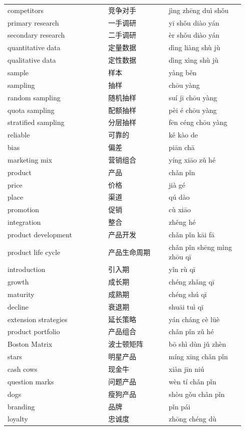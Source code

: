 \documentclass[11pt]{article}
\begin{document}
\begin{longtable}{@{}p{0.40\linewidth}p{0.24\linewidth}p{0.30\linewidth}@{}}
competitors & 竞争对手 & jìng zhēng duì shǒu \\
primary research & 一手调研 & yī shǒu diào yán \\
secondary research & 二手调研 & èr shǒu diào yán \\
quantitative data & 定量数据 & dìng liàng shù jù \\
qualitative data & 定性数据 & dìng xìng shù jù \\
sample & 样本 & yàng běn \\
sampling & 抽样 & chōu yàng \\
random sampling & 随机抽样 & suí jī chōu yàng \\
quota sampling & 配额抽样 & pèi é chōu yàng \\
stratified sampling & 分层抽样 & fēn céng chōu yàng \\
reliable & 可靠的 & kě kào de \\
bias & 偏差 & piān chā \\
marketing mix & 营销组合 & yíng xiāo zǔ hé \\
product & 产品 & chǎn pǐn \\
price & 价格 & jià gé \\
place & 渠道 & qú dào \\
promotion & 促销 & cù xiāo \\
integration & 整合 & zhěng hé \\
product development & 产品开发 & chǎn pǐn kāi fā \\
product life cycle & 产品生命周期 & chǎn pǐn shēng mìng zhōu qī \\
introduction & 引入期 & yǐn rù qī \\
growth & 成长期 & chéng zhǎng qī \\
maturity & 成熟期 & chéng shú qī \\
decline & 衰退期 & shuāi tuì qī \\
extension strategies & 延长策略 & yán cháng cè lüè \\
product portfolio & 产品组合 & chǎn pǐn zǔ hé \\
Boston Matrix & 波士顿矩阵 & bō shì dùn jǔ zhèn \\
stars & 明星产品 & míng xīng chǎn pǐn \\
cash cows & 现金牛 & xiàn jīn niú \\
question marks & 问题产品 & wèn tí chǎn pǐn \\
dogs & 瘦狗产品 & shòu gǒu chǎn pǐn \\
branding & 品牌 & pǐn pái \\
loyalty & 忠诚度 & zhōng chéng dù \\

\end{longtable}
\end{document}
